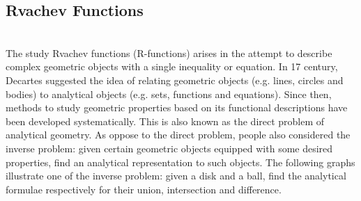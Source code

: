 \documentclass[11pt]{amsart}
\theoremstyle{definition}
\begin{document}
\subsection{Rvachev Functions}~\\
The study Rvachev functions (R-functions) arises in the attempt
to describe complex geometric objects with a single inequality or equation. In
17 century, Decartes suggested the idea of relating geometric objects (e.g.
lines, circles and bodies) to analytical objects (e.g. sets, functions and
equations). Since then, methods to study geometric properties based on its
functional descriptions have been developed systematically. This is also known
as the direct problem of analytical geometry. As oppose to the direct problem,
people also considered the inverse problem: given certain geometric objects
equipped with some desired properties, find an analytical representation to
such objects. The following graphs illustrate one of the inverse problem: given a disk and a ball, find the analytical formulae respectively for their union, intersection and difference. 
\end{document}
